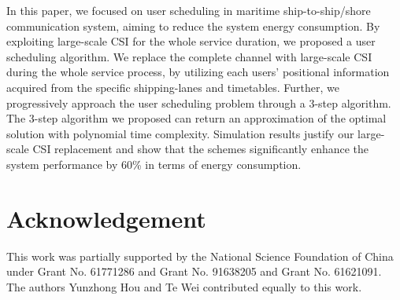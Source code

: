 \documentclass[conference]{IEEEtran}
\begin{document}
 In this paper, we focused on user scheduling in maritime ship-to-ship/shore communication system, aiming to reduce the system energy consumption. By exploiting large-scale CSI for the whole service duration, we proposed a user scheduling algorithm. 
 We replace the complete channel with large-scale CSI during the whole service process, by utilizing each users' positional information acquired from the specific shipping-lanes and timetables. Further, we progressively approach the user scheduling problem through a 3-step algorithm. 
 The 3-step algorithm we proposed can return an approximation of the optimal solution with polynomial time complexity. Simulation results justify our large-scale CSI replacement and show that the schemes significantly enhance the system performance by 60\% in terms of energy consumption.  
 
 
 
 
 \section*{Acknowledgement}
 
 This work was partially supported by the National Science Foundation of China under Grant No. 61771286 and Grant No. 91638205 and Grant No. 61621091. The authors Yunzhong Hou and Te Wei contributed equally to this work.
 
\end{document}
